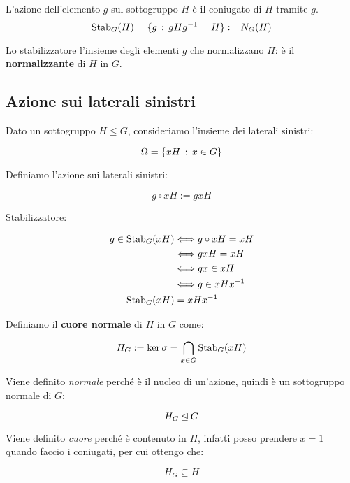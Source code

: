 L'azione dell'elemento $g$ sul sottogruppo $H$ è il coniugato di $H$ tramite $g$.
\begin{equation*}
	\operatorname{Stab}_G(H) = \{g \,:\, gHg^{-1} = H \} := N_G(H)
\end{equation*}

Lo stabilizzatore l'insieme degli elementi $g$ che normalizzano $H$: è il \textbf{normalizzante} di $H$ in $G$.

\subsection{Azione sui laterali sinistri}

Dato un sottogruppo $H \le G$, consideriamo l'insieme dei laterali sinistri:

\begin{equation}
	\Omega = \{ xH \,:\, x \in G \}
\end{equation}
	
Definiamo l'azione sui laterali sinistri:

\begin{equation}
	g \circ xH := gxH
\end{equation}

Stabilizzatore:

\begin{align}
	g \in \operatorname{Stab}_G(xH) &\Longleftrightarrow g \circ xH = xH \\
	&\Longleftrightarrow gxH = xH \\
	&\Longleftrightarrow gx \in xH \\
	&\Longleftrightarrow g \in xHx^{-1} \\
	\operatorname{Stab}_G(xH) &= xHx^{-1}
\end{align}

Definiamo il \textbf{cuore normale} di $H$ in $G$ come:

\begin{equation}
	H_G := \ker \sigma = \bigcap_{x \in G} \operatorname{Stab}_G(xH)
\end{equation}

Viene definito \emph{normale} perché è il nucleo di un'azione, quindi è un sottogruppo normale di $G$:

\begin{equation}
	H_G \unlhd G
\end{equation}

Viene definito \emph{cuore} perché è contenuto in $H$, infatti posso prendere $x = 1$ quando faccio i coniugati, per cui ottengo che:

\begin{equation}
	H_G \subseteq H
\end{equation}

